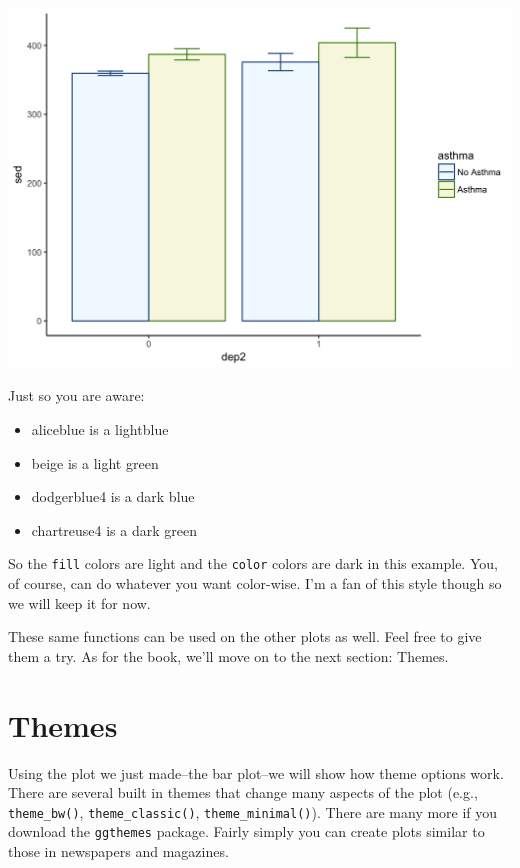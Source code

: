 \documentclass[]{tufte-book}
\providecommand{\tightlist}{%
  \setlength{\itemsep}{0pt}\setlength{\parskip}{0pt}}
\theoremstyle{definition}
\theoremstyle{definition}
\theoremstyle{remark}
\begin{document}
\includegraphics{_main_files/figure-latex/unnamed-chunk-148-1}

Just so you are aware:

\begin{itemize}
\tightlist
\item
  aliceblue is a lightblue
\item
  beige is a light green
\item
  dodgerblue4 is a dark blue
\item
  chartreuse4 is a dark green
\end{itemize}

So the \texttt{fill} colors are light and the \texttt{color} colors are
dark in this example. You, of course, can do whatever you want
color-wise. I'm a fan of this style though so we will keep it for now.

These same functions can be used on the other plots as well. Feel free
to give them a try. As for the book, we'll move on to the next section:
Themes.

\section*{Themes}\label{themes}

Using the plot we just made--the bar plot--we will show how theme
options work. There are several built in themes that change many aspects
of the plot (e.g., \texttt{theme\_bw()}, \texttt{theme\_classic()},
\texttt{theme\_minimal()}). There are many more if you download the
\texttt{ggthemes} package. Fairly simply you can create plots similar to
those in newspapers and magazines.
\end{document}
